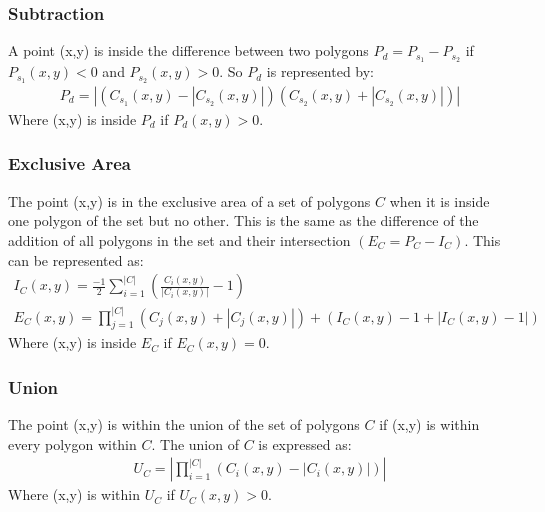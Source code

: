 \documentclass[11pt]{article}
\begin{document}
\subsubsection{Subtraction}
A point (x,y) is inside the difference between two polygons \(P_d=P_{s_1}-P_{s_2}\) if \(P_{s_1}(x,y)<0\) and \(P_{s_2}(x,y) > 0\). So \(P_d\) is represented by:
\begin{gather*}
P_d=\left|(C_{s_1}(x,y)-|C_{s_2}(x,y)|)(C_{s_2}(x,y)+|C_{s_2}(x,y)|)\right|
\end{gather*}
Where (x,y) is inside \(P_d\) if \(P_d(x,y)>0\).\\

\subsubsection{Exclusive Area}
The point (x,y) is in the exclusive area of a set of polygons \(C\) when it is inside one polygon of the set but no other. This is the same as the difference of the addition of all polygons in the set and their intersection \((E_C=P_C-I_C)\). This can be represented as:
\begin{gather*}
I_C(x,y)=\frac{-1}{2}\sum_{i=1}^{|C|}(\frac{C_i(x,y)}{|C_i(x,y)|}-1)\\
E_C(x,y)=\prod_{j=1}^{|C|}(C_j(x,y)+|C_j(x,y)|)+(I_C(x,y)-1+|I_C(x,y)-1|)
\end{gather*}
Where (x,y) is inside \(E_C\) if \(E_C(x,y)=0\).

\subsubsection{Union}
The point (x,y) is within the union of the set of polygons \(C\) if (x,y) is within every polygon within \(C\). The union of \(C\) is expressed as:
\begin{gather*}
U_C=\left|\prod_{i=1}^{|C|}(C_i(x,y)-|C_i(x,y)|)\right|
\end{gather*}
Where (x,y) is within \(U_C\) if \(U_C(x,y)>0\).
\end{document}
